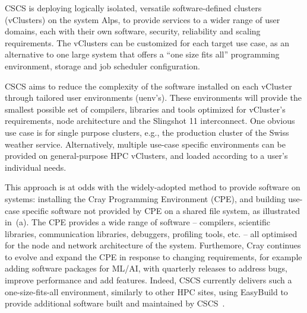 CSCS is deploying logically isolated, versatile software-defined clusters (vClusters)\cite{vClusters2023} on the \crayex system Alps, to provide services to a wider range of user domains, each with their own software, security, reliability and scaling requirements.
The vClusters can be customized for each target use case, as an alternative to one large system that offers a ``one size fits all'' programming environment, storage and job scheduler configuration.

CSCS aims to reduce the complexity of the software installed on each vCluster through tailored user environments (uenv's).
These environments will provide the smallest possible set of compilers, libraries and tools optimized for vCluster's requirements, node architecture and the Slingshot 11 interconnect.
One obvious use case is for single purpose clusters, e.g., the production cluster of the Swiss weather service.
Alternatively, multiple use-case specific environments can be provided on general-purpose HPC vClusters, and loaded according to a user's individual needs.

This approach is at odds with the widely-adopted method to provide software on \crayex systems: installing the Cray Programming Environment (CPE), and building use-case specific software not provided by CPE on a shared file system, as illustrated in~(a).
The CPE provides a wide range of software -- compilers, scientific libraries, communication libraries, debuggers, profiling tools, etc. -- all optimised for the node and network architecture of the system.
Furthemore, Cray continues to evolve and expand the CPE in response to changing requirements, for example adding software packages for ML/AI, with quarterly releases to address bugs, improve performance and add features.
Indeed, CSCS currently delivers such a one-size-fits-all environment, similarly to other HPC sites, using EasyBuild to provide additional software built and maintained by CSCS~\cite{forai:cug16}.

